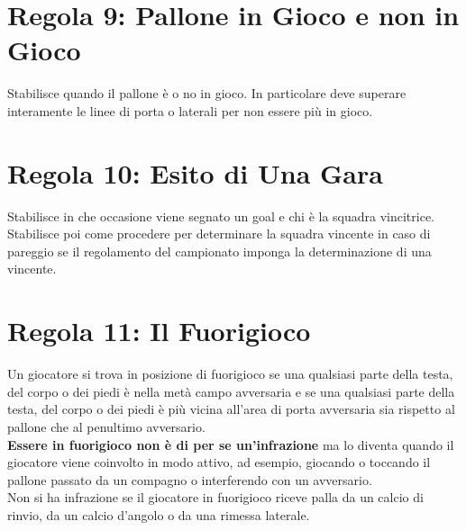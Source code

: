 \documentclass[../uefaC.tex]{subfiles}
\begin{document}
\section{Regola 9: Pallone in Gioco e non in Gioco}
Stabilisce quando il pallone è o no in gioco. In particolare deve superare interamente le linee di porta o laterali per non essere più in gioco.

\section{Regola 10: Esito di Una Gara}
Stabilisce in che occasione viene segnato un goal e chi è la squadra vincitrice. Stabilisce poi come procedere per determinare la squadra vincente in caso di pareggio se il regolamento del campionato imponga la determinazione di una vincente.

\section{Regola 11: Il Fuorigioco}
Un giocatore si trova in posizione di fuorigioco se una qualsiasi parte della testa, del corpo o dei piedi è nella metà campo avversaria e se una qualsiasi parte della testa, del corpo o dei piedi è più vicina all'area di porta avversaria sia rispetto al pallone che al penultimo avversario. \hfill \\
\textbf{Essere in fuorigioco non è di per se un'infrazione} ma lo diventa quando il giocatore viene coinvolto in modo attivo, ad esempio, giocando o toccando il pallone passato da un compagno o interferendo con un avversario. \hfill \\
Non si ha infrazione se il giocatore in fuorigioco riceve palla da un calcio di rinvio, da un calcio d'angolo o da una rimessa laterale.
\end{document}
